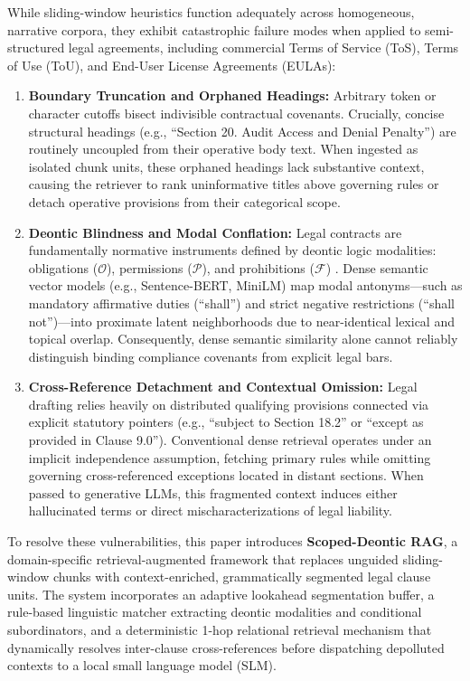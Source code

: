 \documentclass[conference]{IEEEtran}
\begin{document}
While sliding-window heuristics function adequately across homogeneous, narrative corpora, they exhibit catastrophic failure modes when applied to semi-structured legal agreements, including commercial Terms of Service (ToS), Terms of Use (ToU), and End-User License Agreements (EULAs):
\begin{enumerate}
    \item \textbf{Boundary Truncation and Orphaned Headings:} Arbitrary token or character cutoffs bisect indivisible contractual covenants. Crucially, concise structural headings (e.g., ``Section 20. Audit Access and Denial Penalty'') are routinely uncoupled from their operative body text. When ingested as isolated chunk units, these orphaned headings lack substantive context, causing the retriever to rank uninformative titles above governing rules or detach operative provisions from their categorical scope.
    \item \textbf{Deontic Blindness and Modal Conflation:} Legal contracts are fundamentally normative instruments defined by deontic logic modalities: obligations ($\mathcal{O}$), permissions ($\mathcal{P}$), and prohibitions ($\mathcal{F}$) \cite{vonwright1951deontic, sartor2005legal}. Dense semantic vector models (e.g., Sentence-BERT, MiniLM) map modal antonyms---such as mandatory affirmative duties (``shall'') and strict negative restrictions (``shall not'')---into proximate latent neighborhoods due to near-identical lexical and topical overlap. Consequently, dense semantic similarity alone cannot reliably distinguish binding compliance covenants from explicit legal bars.
    \item \textbf{Cross-Reference Detachment and Contextual Omission:} Legal drafting relies heavily on distributed qualifying provisions connected via explicit statutory pointers (e.g., ``subject to Section 18.2'' or ``except as provided in Clause 9.0''). Conventional dense retrieval operates under an implicit independence assumption, fetching primary rules while omitting governing cross-referenced exceptions located in distant sections. When passed to generative LLMs, this fragmented context induces either hallucinated terms or direct mischaracterizations of legal liability.
\end{enumerate}

To resolve these vulnerabilities, this paper introduces \textbf{Scoped-Deontic RAG}, a domain-specific retrieval-augmented framework that replaces unguided sliding-window chunks with context-enriched, grammatically segmented legal clause units. The system incorporates an adaptive lookahead segmentation buffer, a rule-based linguistic matcher extracting deontic modalities and conditional subordinators, and a deterministic 1-hop relational retrieval mechanism that dynamically resolves inter-clause cross-references before dispatching depolluted contexts to a local small language model (SLM).
\end{document}
